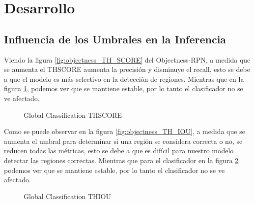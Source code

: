 \section{Desarrollo}


\subsection{Influencia de los Umbrales en la Inferencia}

Viendo la figura \ref{fig:objectness_TH_SCORE} del Objectness-RPN, a medida que se aumenta el TH\textunderscore SCORE aumenta la precisión y disminuye el recall, esto se debe a que el modelo es más selectivo en la detección de regiones. Mientras que en la figura \ref{fig:global_TH_SCORE}, podemos ver que se mantiene estable, por lo tanto el clasificador no se ve afectado.


\begin{figure}[h]
\centering
\begin{minipage}[t]{.5\textwidth}
  \centering
  \resizebox{\linewidth}{!}{}
  \captionsetup{font=footnotesize}
  \caption{Objectness-RPN TH\textunderscore SCORE}
  \label{fig:objectness_TH_SCORE}
\end{minipage}%
\begin{minipage}[t]{.5\textwidth}
  \centering
  \resizebox{\linewidth}{!}{}
  \captionsetup{font=footnotesize}
  \caption{Global Classification TH\textunderscore SCORE}
  \label{fig:global_TH_SCORE}
\end{minipage}
\end{figure}

Como se puede observar en la figura \ref{fig:objectness_TH_IOU}, a medida que se aumenta el umbral para determinar si una región se considera correcta o no, se reducen todas las métricas, esto se debe a que es difícil para nuestro modelo detectar las regiones correctas. Mientras que para el clasificador en la figura \ref{fig:global_TH_IOU} podemos ver que se mantiene estable, por lo tanto el clasificador no se ve afectado.

\begin{figure}[h]
\centering
\begin{minipage}[t]{.5\textwidth}
  \centering
  \resizebox{\linewidth}{!}{}
  \captionsetup{font=footnotesize}
  \caption{Objectness-RPN TH\textunderscore IOU}
  \label{fig:objectness_TH_IOU}
\end{minipage}%
\begin{minipage}[t]{.5\textwidth}
  \centering
  \resizebox{\linewidth}{!}{}
  \captionsetup{font=footnotesize}
  \caption{Global Classification TH\textunderscore IOU}
  \label{fig:global_TH_IOU}
\end{minipage}
\end{figure}


